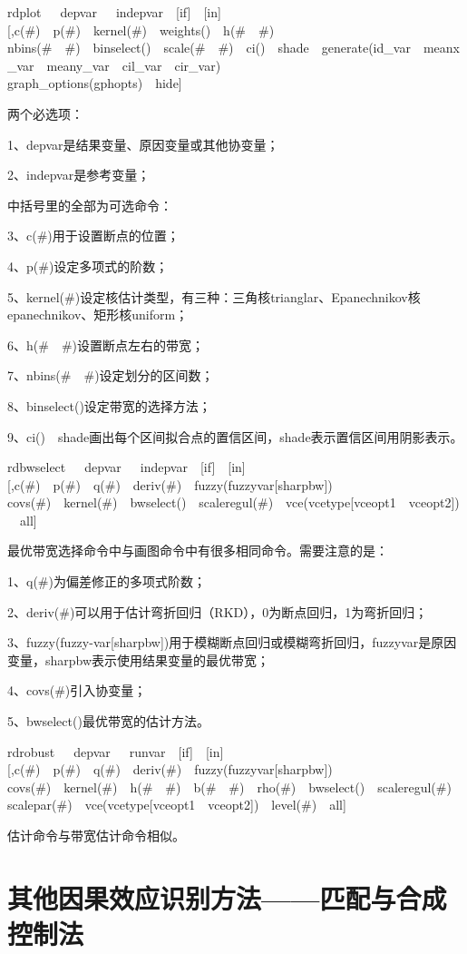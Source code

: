 \documentclass[cn,12pt,math=newtx,citestyle=gb7714-2015,bibstyle=gb7714-2015]{elegantbook}
\begin{document}
	rdplot~~~depvar~~~indepvar~~[if]~~[in][,c(\#)~~p(\#)~~kernel(\#)~~weights()~~h(\#~~\#)~~\\
	nbins(\#~~\#)~~binselect()~~scale(\#~~\#)~~ci()~~shade~~generate(id\_var~~meanx\_var~~meany\_var~~cil\_var~~cir\_var)~~\\
	graph\_options(gphopts)~~hide]
	
	两个必选项：
	
	1、depvar是结果变量、原因变量或其他协变量；
	
	2、indepvar是参考变量；
	
	中括号里的全部为可选命令：
	
	3、c(\#)用于设置断点的位置；
	
	4、p(\#)设定多项式的阶数；
	
	5、kernel(\#)设定核估计类型，有三种：三角核trianglar、Epanechnikov核epanechnikov、矩形核uniform；
	
	6、h(\#~~\#)设置断点左右的带宽；
	
	7、nbins(\#~~\#)设定划分的区间数；
	
	8、binselect()设定带宽的选择方法；
	
	9、ci()~~shade画出每个区间拟合点的置信区间，shade表示置信区间用阴影表示。
	
	rdbwselect~~~depvar~~~indepvar~~[if]~~[in][,c(\#)~~p(\#)~~q(\#)~~deriv(\#)~~fuzzy(fuzzyvar[sharpbw])~~\\
	covs(\#)~~kernel(\#)~~bwselect()~~scaleregul(\#)~~vce(vcetype[vceopt1~~vceopt2])~~all]
	
	最优带宽选择命令中与画图命令中有很多相同命令。需要注意的是：
	
	1、q(\#)为偏差修正的多项式阶数；
	
	2、deriv(\#)可以用于估计弯折回归（RKD），0为断点回归，1为弯折回归；
	
	3、fuzzy(fuzzy-var[sharpbw])用于模糊断点回归或模糊弯折回归，fuzzyvar是原因变量，sharpbw表示使用结果变量的最优带宽；
	
	4、covs(\#)引入协变量；
	
	5、bwselect()最优带宽的估计方法。
	
	rdrobust~~~depvar~~~runvar~~[if]~~[in][,c(\#)~~p(\#)~~q(\#)~~deriv(\#)~~fuzzy(fuzzyvar[sharpbw])~~\\
	covs(\#)~~kernel(\#)~~h(\#~~\#)~~b(\#~~\#)~~rho(\#)~~bwselect()~~scaleregul(\#)~~\\
	scalepar(\#)~~vce(vcetype[vceopt1~~vceopt2])~~level(\#)~~all]
	
	估计命令与带宽估计命令相似。
	
	
	\section{其他因果效应识别方法——匹配与合成控制法}
	
\end{document}
